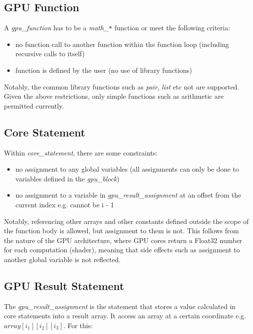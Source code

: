 \subsection*{GPU Function}

A \textit{gpu\_function} has to be a \textit{math\_\texttt{*}} function or meet the following criteria:

\begin{itemize}
    \item{no function call to another function within the function loop (including recursive calls to itself)}
    \item{function is defined by the user (no use of library functions)}
\end{itemize}

Notably, the common library functions such as \textit{pair}, \textit{list} etc not are supported. Given the above restrictions, only simple functions such as arithmetic are permitted currently.


\subsection*{Core Statement}

Within \textit{core\_statement}, there are some constraints:

\begin{itemize}
    \item{no assignment to any global variables (all assignments can only be done to variables defined in the \textit{gpu\_block}})
    \item{no assignment to a variable in \textit{gpu\_result\_assignment} at an offset from the current index e.g. cannot be i - 1}
\end{itemize}

Notably, referencing other arrays and other constants defined outside the scope of the function body is allowed, but assignment to them is not. This follows from the nature of the GPU architecture, where GPU cores return a Float32 number for each computation (shader), meaning that side effects such as assignment to another global variable is not reflected. 

\subsection*{GPU Result Statement}

The \textit{gpu\_result\_assignment} is the statement that stores a value calculated in core statements into a result array. 
It access an array at a certain coordinate e.g. ${array[{i_1}][{i_2}][{i_3}]}$. For this:

